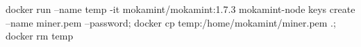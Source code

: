 \begin{shellcommandbox}\begin{ttlst}
docker run --name temp -it mokamint/mokamint:1.7.3 mokamint-node keys create --name miner.pem --password; docker cp temp:/home/mokamint/miner.pem .; docker rm temp
\end{ttlst}\end{shellcommandbox}
